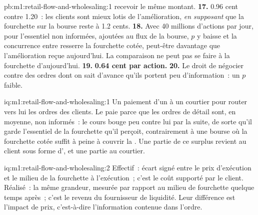 \begin{solution}{pb:m1:retail-flow-and-wholesaling:1}
recevoir le même montant.
\textbf{17.} 0.96 cent contre 1.20~: les clients sont mieux lotis de
l'amélioration, \emph{en supposant} que la fourchette sur la bourse reste à 1.2 cents.
\textbf{18.} Avec 40 millions d'actions par jour, pour l'essentiel non informées, ajoutées au
flux de la bourse, $p$ y baisse et la concurrence entre  resserre
la fourchette cotée, peut-être davantage que l'amélioration reçue aujourd'hui. La
comparaison ne peut pas se faire à la fourchette d'aujourd'hui.
\textbf{19.} \textbf{0.64 cent par action.}
\textbf{20.} Le droit de négocier contre des ordres dont on sait d'avance qu'ils
portent peu d'information~: un $p$ faible.
\end{solution}

\begin{solution}{iq:m1:retail-flow-and-wholesaling:1}
Un paiement d'un  à un courtier pour router vers lui les ordres des clients.
Le  paie parce que les ordres de détail sont, en moyenne, non informés~: le
cours bouge peu contre lui par la suite, de sorte qu'il garde l'essentiel de la fourchette
qu'il perçoit, contrairement à une bourse où la fourchette cotée suffit à peine à couvrir
la . Une partie de ce surplus revient au client sous forme
d', et une partie au courtier.
\end{solution}

\begin{solution}{iq:m1:retail-flow-and-wholesaling:2}
Effectif~: écart signé entre le prix d'exécution et le milieu de la fourchette à
l'exécution~; c'est le coût supporté par le client. Réalisé~: la même grandeur,
mesurée par rapport au milieu de fourchette quelque temps après~; c'est le revenu du fournisseur de liquidité. Leur différence est
l'impact de prix, c'est-à-dire l'information contenue dans l'ordre.
\end{solution}

